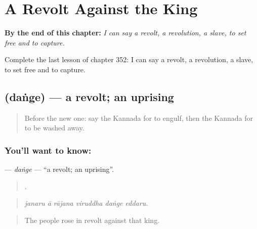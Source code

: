 
\chapter{A Revolt Against the King}
\label{ch:ka-a-revolt-against-the-king}

\begin{chapteropening}
\textbf{By the end of this chapter:} \emph{I can say a revolt, a revolution, a slave, to set free and to capture.}

Complete the last lesson of chapter 352: I can say a revolt, a revolution, a slave, to set free and to capture.
\end{chapteropening}

\section[\texorpdfstring{\kn{ದಂಗೆ} (daṅge)}{ದಂಗೆ (daṅge)}]{ (daṅge) — a revolt; an uprising}

\label{lesson:KA-C352-dange}



\begin{quote}
Before the new one: say the Kannada for to engulf, then the Kannada for to be washed away.
\end{quote}

\subsection*{You'll want to know: }
\textbf{} — \emph{daṅge} — \textquotedblleft{}a revolt; an uprising\textquotedblright{}.

\begin{quote}
     .
\end{quote}

\begin{quote}
\emph{janaru ā rājana viruddha daṅge eddaru.}
\end{quote}

\begin{quote}
The people rose in revolt against that king.
\end{quote}


